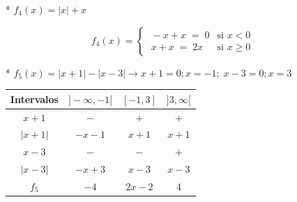 {\begin{proofw}
\begin{itemize}
			\begin{multicols}{2} 
			
				\begin{table}[H]
					\centering
					\begin{tabular}{|c|c|c|c|}
					\hline
					Intervalos & $]0, 1[$ & $1$ & $]1, \infty[$ \\ \hline
					$\ln x$ & $-$ &  $0$ & $+$ \\ \hline	
					\end{tabular}
				\end{table}
			
				\begin{equation*}
					f_3(x)=
					\begin{cases} 
					\;  -\ln x &\mbox{si } 0<x<1 \\ 
					\; \ln x &\mbox{si } x\ge 1 
					\end{cases}
				\end{equation*}
				
			\end{multicols}
			
		\item [*] $f_4(x)=|x|+x$
			
				\begin{equation*}
					f_4(x)=
					\begin{cases} 
					\;  -x+x\; = \; 0 &\mbox{si } x<0 \\ 
					\; x+x\; = \; 2x&\mbox{si } x\ge 0 
					\end{cases}
				\end{equation*}
		
		\item [*] $f_5(x)=|x+1|-|x-3| \to x+1=0;x=-1; \; x-3=0; x=3$
		 
			\begin{multicols}{2} 
			
				\begin{table}[H]
					\centering
					\begin{tabular}{|c|c|c|c|}
					\hline
					Intervalos & $]-\infty, -1[$ & $[-1,3]$ & $]3, \infty[$ \\ \hline
					$x+1$ & $-$ &  $+$ & $+$ \\ \hline	
					$|x+1|$ & $-x-1$ & $x+1$ & $x+1$ \\ \hline
					$x-3$ & $-$ & $-$ & $+$ \\ \hline
					$|x-3|$ & $-x+3$ & $x-3$ & $x-3$ \\ \hline
					$f_5$ & $-4$ & $2x-2$ & $4$ \\ \hline
					\end{tabular}
				\end{table}
			

\end{multicols}
\end{itemize}
\end{proofw}}
